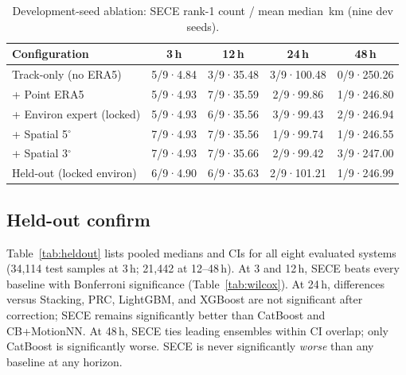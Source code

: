 \documentclass[11pt]{article}
\newcommand{\sece}{SECE}
\newcommand{\era}{ERA5}
\newcommand{\km}{\,km}
\begin{document}
\begin{table}[ht]
\caption{Development-seed ablation: \sece{} rank-1 count / mean median \km{} (nine dev seeds).}
\label{tab:abl}
\centering
\small
\begin{tabular}{@{}lcccc@{}}
\toprule
Configuration & 3\,h & 12\,h & 24\,h & 48\,h \\
\midrule
Track-only (no \era{}) & 5/9·4.84 & 3/9·35.48 & 3/9·100.48 & 0/9·250.26 \\
+ Point \era{} & 5/9·4.93 & 7/9·35.59 & 2/9·99.86 & 1/9·246.80 \\
+ Environ expert (locked) & 5/9·4.93 & 6/9·35.56 & 3/9·99.43 & 2/9·246.94 \\
+ Spatial 5$^\circ$ & 7/9·4.93 & 7/9·35.56 & 1/9·99.74 & 1/9·246.55 \\
+ Spatial 3$^\circ$ & 7/9·4.93 & 7/9·35.66 & 2/9·99.42 & 3/9·247.00 \\
Held-out (locked environ) & 6/9·4.90 & 6/9·35.63 & 2/9·101.21 & 1/9·246.99 \\
\bottomrule
\end{tabular}
\end{table}

\subsection{Held-out confirm}
Table~\ref{tab:heldout} lists pooled medians and CIs for all eight evaluated systems (34{,}114 test samples at 3\,h; 21{,}442 at 12--48\,h).
At 3 and 12\,h, \sece{} beats every baseline with Bonferroni significance (Table~\ref{tab:wilcox}).
At 24\,h, differences versus Stacking, PRC, LightGBM, and XGBoost are not significant after correction; \sece{} remains significantly better than CatBoost and CB+MotionNN.
At 48\,h, \sece{} ties leading ensembles within CI overlap; only CatBoost is significantly worse.
\sece{} is never significantly \emph{worse} than any baseline at any horizon.
\end{document}
